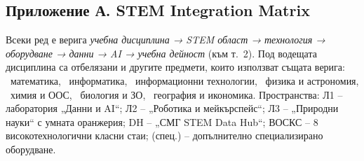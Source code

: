 \documentclass[11pt,a4paper]{article}
\begin{document}
\subsection*{Приложение А. STEM Integration Matrix}

Всеки ред е верига \emph{учебна дисциплина → STEM област → технология → оборудване → данни → AI → учебна дейност} (към т.~2). Под водещата дисциплина са отбелязани и другите предмети, които използват същата верига: \sIIbM~математика, \sIIbI~информатика, \sIIbIT~информационни технологии, \sIIbF~физика и астрономия, \sIIbH~химия и ООС, \sIIbB~биология и ЗО, \sIIbG~география и икономика. Пространства: Л1 – лаборатория „Данни и AI“; Л2 – „Роботика и мейкърспейс“; Л3 – „Природни науки“ с умната оранжерия; DH – „СМГ STEM Data Hub“; ВОСКС – 8 високотехнологични класни стаи; (спец.) – допълнително специализирано оборудване.
\end{document}
